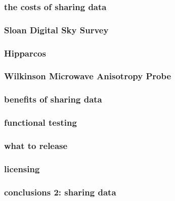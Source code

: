 \documentclass[pdftex]{beamer}
\begin{document}
\begin{frame}
  \frametitle{the costs of sharing data}
\end{frame}

\begin{frame}
  \frametitle{Sloan Digital Sky Survey}
\end{frame}

\begin{frame}
  \frametitle{Hipparcos}
\end{frame}

\begin{frame}
  \frametitle{Wilkinson Microwave Anisotropy Probe}
\end{frame}

\begin{frame}
  \frametitle{benefits of sharing data}
\end{frame}

\begin{frame}
  \frametitle{functional testing}
\end{frame}

\begin{frame}
  \frametitle{what to release}
\end{frame}

\begin{frame}
  \frametitle{licensing}
\end{frame}

\begin{frame}
  \frametitle{conclusions 2: sharing data}
\end{frame}
\end{document}
